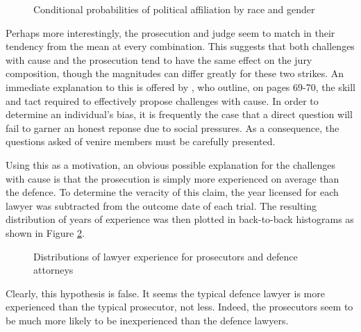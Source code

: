 \begin{figure}[h!]
  \caption[Political Affiliation by Race and Gender (Sunshine)]
  {Conditional probabilities of political affiliation by race and gender} 
  \label{fig:racepolitics}
\end{figure}

Perhaps more interestingly, the prosecution and judge seem to match in their tendency from the mean at every combination. This
suggests that both challenges with cause and the prosecution tend to have the same effect on the jury composition, though the
magnitudes can differ greatly for these two strikes. An immediate explanation to this is offered by \cite{hansvidjudging}, who
outline, on pages 69-70, the skill and tact required to effectively propose challenges with cause. In order to determine an
individual's bias, it is frequently the case that a direct question will fail to garner an honest reponse due to social pressures.
As a consequence, the questions asked of venire members must be carefully presented.

Using this as a motivation, an obvious possible explanation for the challenges with cause is that the prosecution is simply more
experienced on average than the defence. To determine the veracity of this claim, the year licensed for each lawyer was
subtracted from the outcome date of each trial. The resulting distribution of years of experience was then plotted in back-to-back
histograms as shown in Figure \ref{fig:lawyerexp}.

\begin{figure}[h!]
  \caption[Lawyer Experience (Sunshine)]
  {Distributions of lawyer experience for prosecutors and defence attorneys}
  \label{fig:lawyerexp}
\end{figure}

Clearly, this hypothesis is false. It seems the typical defence lawyer is more experienced than the typical prosecutor, not
less. Indeed, the prosecutors seem to be much more likely to be inexperienced than the defence lawyers.